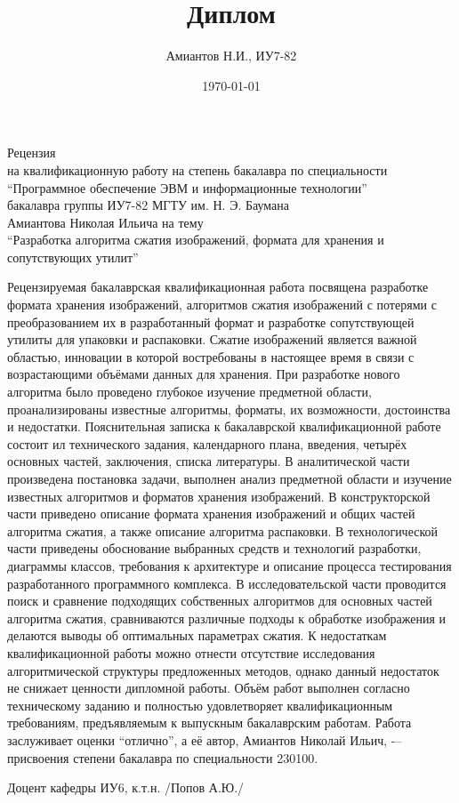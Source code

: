 \documentclass[a4paper,12pt]{article}
\title{Диплом}
\author{Амиантов Н.И., ИУ7-82}
\date{\today}
\begin{document}

\begin{center}
{\Large Рецензия} \\
на квалификационную работу на степень бакалавра по специальности \\
``Программное обеспечение ЭВМ и информационные технологии'' \\
бакалавра группы ИУ7-82 МГТУ им. Н. Э. Баумана \\
Амиантова Николая Ильича на тему \\
``Разработка алгоритма сжатия изображений, формата для хранения и сопутствующих утилит''
\end{center}

Рецензируемая бакалаврская квалификационная работа посвящена разработке формата
хранения изображений, алгоритмов сжатия изображений с потерями с преобразованием
их в разработанный формат и разработке сопутствующей утилиты для упаковки и
распаковки. Сжатие изображений является важной областью, инновации в которой
востребованы в настоящее время в связи с возрастающими объёмами данных для
хранения. При разработке нового алгоритма было проведено глубокое изучение
предметной области, проанализированы известные алгоритмы, форматы, их
возможности, достоинства и недостатки. Пояснительная записка к бакалаврской
квалификационной работе состоит ил технического задания, календарного плана,
введения, четырёх основных частей, заключения, списка литературы.  В
аналитической части произведена постановка задачи, выполнен анализ предметной
области и изучение известных алгоритмов и форматов хранения изображений. В
конструкторской части приведено описание формата хранения изображений и общих
частей алгоритма сжатия, а также описание алгоритма распаковки. В
технологической части приведены обоснование выбранных средств и технологий
разработки, диаграммы классов, требования к архитектуре и описание процесса
тестирования разработанного программного комплекса. В исследовательской части
проводится поиск и сравнение подходящих собственных алгоритмов для основных
частей алгоритма сжатия, сравниваются различные подходы к обработке изображения
и делаются выводы об оптимальных параметрах сжатия. К недостаткам
квалификационной работы можно отнести отсутствие исследования алгоритмической
структуры предложенных методов, однако данный недостаток не снижает ценности
дипломной работы. Объём работ выполнен согласно техническому заданию и полностью
удовлетворяет квалификационным требованиям, предъявляемым к выпускным
бакалаврским работам. Работа заслуживает оценки ``отлично'', а её автор, Амиантов
Николай Ильич, -– присвоения степени бакалавра по специальности 230100.

\vfill

Доцент кафедры ИУ6, к.т.н. \hfill /Попов А.Ю./
\end{document}
